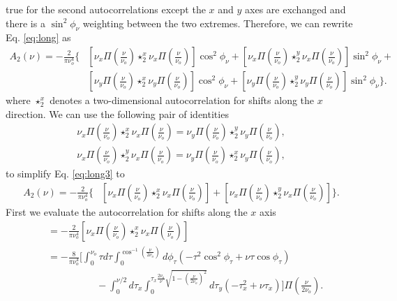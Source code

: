 \documentclass{osa-article}
\begin{document}
true for the second autocorrelations except the $x$ and $y$ axes are exchanged
and there is a $\sin^2\phi_{\nu}$ weighting between the two extremes. Therefore,
we can rewrite Eq. \ref{eq:long} as
\begin{align}
  A_2(\nu) = -\frac{2}{\pi\nu_o^4}\Bigg\{&\left[\nu_x\Pi\left(\frac{\nu}{\nu_o}\right) \star_2^x \nu_x\Pi\left(\frac{\nu}{\nu_o}\right)\right]\cos^2\phi_\nu + \left[\nu_x\Pi\left(\frac{\nu}{\nu_o}\right) \star_2^y \nu_x\Pi\left(\frac{\nu}{\nu_o}\right)\right]\sin^2\phi_\nu + \nonumber\\ &\left[\nu_y\Pi\left(\frac{\nu}{\nu_o}\right) \star_2^x \nu_y\Pi\left(\frac{\nu}{\nu_o}\right)\right]\cos^2\phi_\nu + \left[\nu_y\Pi\left(\frac{\nu}{\nu_o}\right) \star_2^y \nu_y\Pi\left(\frac{\nu}{\nu_o}\right)\right]\sin^2\phi_\nu\Bigg\}. \label{eq:long3}
\end{align}
where $\star_2^x$ denotes a two-dimensional autocorrelation for shifts along
the $x$ direction. We can use the following pair of identities
\begin{align}
  \nu_x\Pi\left(\frac{\nu}{\nu_o}\right) \star_2^x \nu_x\Pi\left(\frac{\nu}{\nu_o}\right) = \nu_y\Pi\left(\frac{\nu}{\nu_o}\right) \star_2^y \nu_y\Pi\left(\frac{\nu}{\nu_o}\right),\\
  \nu_x\Pi\left(\frac{\nu}{\nu_o}\right) \star_2^y \nu_x\Pi\left(\frac{\nu}{\nu_o}\right) = \nu_y\Pi\left(\frac{\nu}{\nu_o}\right) \star_2^x \nu_y\Pi\left(\frac{\nu}{\nu_o}\right),
\end{align}
to simplify Eq. \ref{eq:long3} to
\begin{align}
  A_2(\nu) = -\frac{2}{\pi\nu_o^4}\Bigg\{&\left[\nu_x\Pi\left(\frac{\nu}{\nu_o}\right) \star_2^x \nu_x\Pi\left(\frac{\nu}{\nu_o}\right)\right] + \left[\nu_x\Pi\left(\frac{\nu}{\nu_o}\right) \star_2^y \nu_x\Pi\left(\frac{\nu}{\nu_o}\right)\right]\Bigg\}. \label{eq:long4}
\end{align}
First we evaluate the autocorrelation for shifts along the $x$ axis
\begin{align}
  &= -\frac{2}{\pi\nu_o^4}\left[\nu_x\Pi\left(\frac{\nu}{\nu_o}\right) \star_2^x \nu_x\Pi\left(\frac{\nu}{\nu_o}\right)\right]\\
  &= -\frac{8}{\pi\nu_o^4}\Bigg[\int_0^{\nu_o}\tau d\tau\int_0^{\cos^{-1}\left(\frac{\nu}{2\nu_o}\right)}d\phi_{\tau}(-\tau^2\cos^2\phi_{\tau} + \nu\tau\cos\phi_{\tau})\\ &\hspace{5em}- \int_{0}^{\nu/2}d\tau_x\int_0^{\tau_x\frac{2\nu_o}{\nu}\sqrt{1 - \left(\frac{\nu}{2\nu_o}\right)^2}}d\tau_y(-\tau_x^2 + \nu\tau_x)\Bigg]\Pi\left(\frac{\nu}{2\nu_o}\right).
\end{align}
\end{document}
